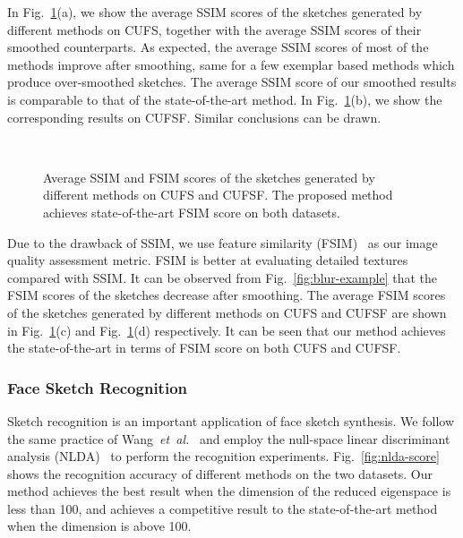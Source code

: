 \documentclass[runningheads]{llncs}
\def \etal {{\em et~al.}}
\begin{document}
In Fig.~\ref{fig:cufs-score}(a), we show the average SSIM scores of the sketches generated by different methods on CUFS, together with the average SSIM scores of their smoothed counterparts. As expected, the average SSIM scores of most of the methods improve after smoothing, same for a few exemplar based methods which produce over-smoothed sketches. The average SSIM score of our smoothed results is comparable to that of the state-of-the-art method. In Fig.~\ref{fig:cufs-score}(b), we show the corresponding results on CUFSF. Similar conclusions can be drawn.

\captionsetup{position=bottom}
\begin{figure}[htbp]
   \\
   \caption{Average SSIM and FSIM scores of the sketches generated by different methods on CUFS and CUFSF. The proposed method achieves state-of-the-art FSIM score on both datasets.}
   \label{fig:cufs-score}
\end{figure}

Due to the drawback of SSIM, we use feature similarity (FSIM)~\cite{zhang2011fsim} as our image quality assessment metric. FSIM is better at evaluating detailed textures compared with SSIM. It can be observed from Fig.~\ref{fig:blur-example} that the FSIM scores of the sketches decrease after smoothing. The average FSIM scores of the sketches generated by different methods on CUFS and CUFSF are shown in Fig.~\ref{fig:cufs-score}(c) and Fig.~\ref{fig:cufs-score}(d) respectively. It can be seen that our method achieves the state-of-the-art in terms of FSIM score on both CUFS and CUFSF.

\subsubsection{Face Sketch Recognition}

Sketch recognition is an important application of face sketch synthesis. We follow the same practice of Wang~\etal~\cite{wangrslcr} and employ the null-space linear discriminant analysis (NLDA)~\cite{chen2000new} to perform the recognition experiments. Fig.~\ref{fig:nlda-score} shows the recognition accuracy of different methods on the two datasets. Our method achieves the best result when the dimension of the reduced eigenspace is less than 100, and achieves a competitive result to the state-of-the-art method~\cite{ijcai2017-500} when the dimension is above 100.
\end{document}
